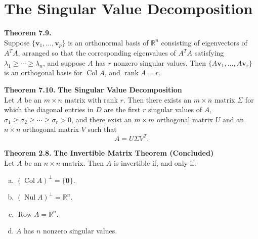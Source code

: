\documentclass[10pt]{book}
\newenvironment{boxthm}{\begin{mdframed}[backgroundcolor=gray!30,nobreak=true]}{\end{mdframed}}
\newcommand{\R}{\mathbb{R}}
\newcommand{\vect}[1]{\ensuremath{\boldsymbol{\mathbf{#1}}}}
\DeclareMathOperator{\Nul}{Nul}
\DeclareMathOperator{\Col}{Col}
\DeclareMathOperator{\Row}{Row}
\DeclareMathOperator{\rank}{rank}
\newcommand{\vectsetvp}{\{\vect{v}_1,\ldots,\vect{v}_p\}}
\begin{document}
\newpage


\section[The SVD]{The Singular Value Decomposition}



\begin{boxthm}
	\textbf{Theorem 7.9.} \\
	Suppose $\vectsetvp$ is an orthonormal basis of $\R^n$ consisting of eigenvectors of $A^TA$, arranged so that the corresponding eigenvalues of $A^TA$ satisfying $\lambda_1\geq\cdots\geq\lambda_n$, and suppose $A$ has $r$ nonzero singular values. Then $\{A\vect{v}_1,\ldots,A\vect{v}_r\}$ is an orthogonal basis for $\Col A$, and $\rank A=r$.
\end{boxthm}
\begin{boxthm}
	\textbf{Theorem 7.10.}
	\textbf{The Singular Value Decomposition} \\
	Let $A$ be an $m\times n$ matrix with rank $r$. Then there exists an $m\times n$ matrix $\Sigma$ for which the diagonal entries in $D$ are the first $r$ singular values of $A$, $\sigma_1\geq\sigma_2\geq\cdots\geq\sigma_r>0$, and there exist an $m\times m$ orthogonal matrix $U$ and an $n\times n$ orthogonal matrix $V$ such that
	$$ A = U\Sigma V^T. $$
\end{boxthm}
\begin{boxthm}
	\textbf{Theorem 2.8.}
	\textbf{The Invertible Matrix Theorem (Concluded)} \\
	Let $A$ be an $n\times n$ matrix. Then $A$ is invertible if, and only if:
	\begin{enumerate}[(a)]\itemsep0em
		\setcounter{enumi}{20}
		\item $(\Col A)^\perp = \{\vect{0}\}$.
		\item $(\Nul A)^\perp = \R^n$.
		\item $\Row A = \R^n$.
		\item $A$ has $n$ nonzero singular values.
	\end{enumerate}
\end{boxthm}
\end{document}
